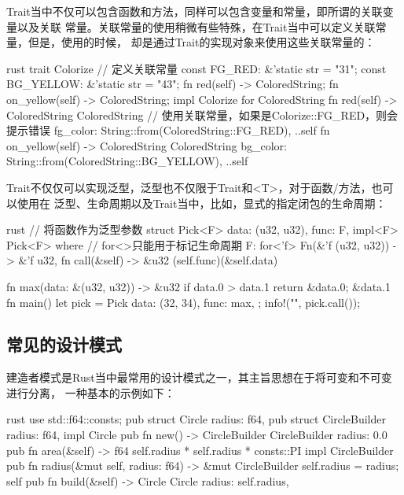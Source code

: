 Trait当中不仅可以包含函数和方法，同样可以包含变量和常量，即所谓的关联变量以及关联
常量。关联常量的使用稍微有些特殊，在Trait当中可以定义关联常量，但是，使用的时候，
却是通过Trait的实现对象来使用这些关联常量的：
\begin{code-block}{rust}
trait Colorize {
    // 定义关联常量
    const FG_RED: &'static str = "31";
    const BG_YELLOW: &'static str = "43";
    fn red(self) -> ColoredString;
    fn on_yellow(self) -> ColoredString;
}
impl Colorize for ColoredString {
    fn red(self) -> ColoredString {
        ColoredString {
            // 使用关联常量，如果是Colorize::FG_RED，则会提示错误
            fg_color: String::from(ColoredString::FG_RED),
            ..self
        }
    }
    fn on_yellow(self) -> ColoredString {
        ColoredString {
            bg_color: String::from(ColoredString::BG_YELLOW),
            ..self
        }
    }
}
\end{code-block}

Trait不仅仅可以实现泛型，泛型也不仅限于Trait和<T>，对于函数/方法，也可以使用在
泛型、生命周期以及Trait当中，比如，显式的指定闭包的生命周期：
\begin{code-block}{rust}
// 将函数作为泛型参数
struct Pick<F> {
    data: (u32, u32),
    func: F,
}
impl<F> Pick<F>
where
    // for<>只能用于标记生命周期
    F: for<'f> Fn(&'f (u32, u32)) -> &'f u32,
{
    fn call(&self) -> &u32 {
        (self.func)(&self.data)
    }
}

fn max(data: &(u32, u32)) -> &u32 {
    if data.0 > data.1 {
        return &data.0;
    }
    &data.1
}
fn main() {
    let pick = Pick {
        data: (32, 34),
        func: max,
    };
    info!("{}", pick.call());
}
\end{code-block}

\subsection{常见的设计模式}
建造者模式是Rust当中最常用的设计模式之一，其主旨思想在于将可变和不可变进行分离，
一种基本的示例如下：
\begin{code-block}{rust}
use std::f64::consts;
pub struct Circle {
    radius: f64,
}
pub struct CircleBuilder {
    radius: f64,
}
impl Circle {
    pub fn new() -> CircleBuilder {
        CircleBuilder { radius: 0.0 }
    }
    pub fn area(&self) -> f64 {
        self.radius * self.radius * consts::PI
    }
}
impl CircleBuilder {
    pub fn radius(&mut self, radius: f64) -> &mut CircleBuilder {
        self.radius = radius;
        self
    }
    pub fn build(&self) -> Circle {
        Circle {
            radius: self.radius,
        }
    }
}
\end{code-block}

